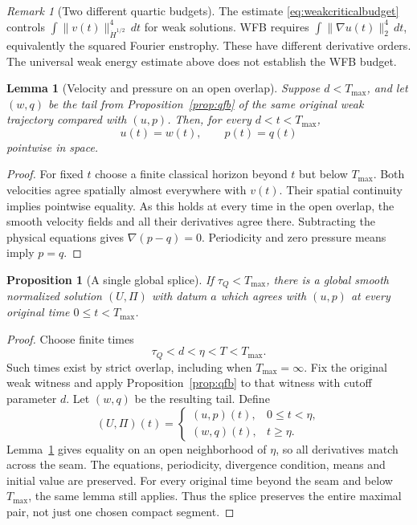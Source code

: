 \documentclass[11pt,a4paper]{article}
\numberwithin{equation}{section}
\theoremstyle{plain}
\newtheorem{proposition}[theorem]{Proposition}
\newtheorem{lemma}[theorem]{Lemma}
\theoremstyle{definition}
\theoremstyle{remark}
\newtheorem{remark}[theorem]{Remark}
\newcommand{\HH}[1]{\dot H^{#1}}
\newcommand{\norm}[2]{\lVert #1\rVert_{#2}}
\newcommand{\Tmax}{T_{\max}}
\newcommand{\tq}{\tau_Q}
\begin{document}
\begin{remark}[Two different quartic budgets]\label{rem:twobudgets}
The estimate \eqref{eq:weakcriticalbudget} controls
$\int\norm{v(t)}{\HH{1/2}}^4\,dt$ for weak solutions. WFB requires
$\int\norm{\nabla u(t)}{2}^4\,dt$, equivalently the squared Fourier
enstrophy. These have different derivative orders. The universal weak
energy estimate above does not establish the WFB budget.
\end{remark}


\begin{lemma}[Velocity and pressure on an open overlap]\label{lem:overlap}
Suppose $d<\Tmax$, and let $(w,q)$ be the tail from Proposition~\ref{prop:qfb}
of the \emph{same} original weak trajectory compared with $(u,p)$.
Then, for every $d<t<\Tmax$,
\begin{equation}\label{eq:overlap}
 u(t)=w(t),\qquad p(t)=q(t)
\end{equation}
pointwise in space.
\end{lemma}
\begin{proof}
For fixed $t$ choose a finite classical horizon beyond $t$ but below
$\Tmax$. Both velocities agree spatially almost everywhere with $v(t)$.
Their spatial continuity implies pointwise equality. As this holds at
every time in the open overlap, the smooth velocity fields and all
their derivatives agree there. Subtracting the physical equations gives
$\nabla(p-q)=0$. Periodicity and zero pressure means imply $p=q$.
\end{proof}

\begin{proposition}[A single global splice]\label{prop:splice}
If $\tq<\Tmax$, there is a global smooth normalized solution $(U,\Pi)$
with datum $a$ which agrees with $(u,p)$ at every original time
$0\le t<\Tmax$.
\end{proposition}
\begin{proof}
Choose finite times
\begin{equation}\label{eq:splicechoices}
 \tq<d<\eta<T<\Tmax.
\end{equation}
Such times exist by strict overlap, including when $\Tmax=\infty$.
Fix the original weak witness and apply Proposition~\ref{prop:qfb} to
that witness with cutoff parameter $d$. Let $(w,q)$ be the resulting tail.
Define
\[
 (U,\Pi)(t)=
 \begin{cases}
 (u,p)(t),&0\le t<\eta,\\
 (w,q)(t),&t\ge\eta.
 \end{cases}
\]
Lemma~\ref{lem:overlap} gives equality on an open neighborhood of
$\eta$, so all derivatives match across the seam. The equations,
periodicity, divergence condition, means and initial value are preserved.
For every original time beyond the seam and below $\Tmax$, the same
lemma still applies. Thus the splice preserves the entire maximal pair,
not just one chosen compact segment.
\end{proof}
\end{document}
